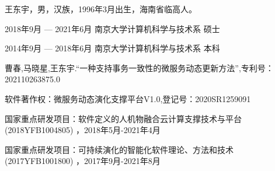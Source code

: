 \documentclass[macfonts,master]{njuthesis}
\begin{document}
\backmatter
\begin{resume}
\begin{authorinfo}
\noindent 王东宇，男，汉族，1996年3月出生，海南省临高人。
\end{authorinfo}
\begin{education}
\item[2018年9月 --- 2021年6月] 南京大学计算机科学与技术系 \hfill 硕士
\item[2014年9月 --- 2018年6月] 南京大学计算机科学与技术系 \hfill 本科
\end{education}
\begin{publications}
\item 曹春,马晓星,王东宇.``一种支持事务一致性的微服务动态更新方法'',专利号：202110263875.0
\item 软件著作权：微服务动态演化支撑平台V1.0,登记号：2020SR1259091
\end{publications}
\begin{projects}
\item 国家重点研发项目：软件定义的人机物融合云计算支撑技术与平台 (2018YFB1004805) ，2018年5月-2021年4月
\item 国家重点研发项目：可持续演化的智能化软件理论、方法和技术 (2017YFB1001800) ，2017年9月-2021年8月
\end{projects}
\end{resume}

\makelicense

\end{document}
